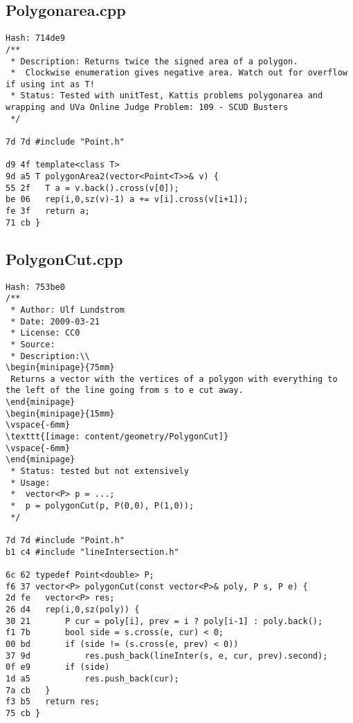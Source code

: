 \documentclass[11pt, a4paper, twoside]{article}
\begin{document}
\subsection{Polygonarea.cpp}
\begin{lstlisting}
Hash: 714de9
/**
 * Description: Returns twice the signed area of a polygon.
 *  Clockwise enumeration gives negative area. Watch out for overflow if using int as T!
 * Status: Tested with unitTest, Kattis problems polygonarea and wrapping and UVa Online Judge Problem: 109 - SCUD Busters
 */

7d 7d #include "Point.h"

d9 4f template<class T>
9d a5 T polygonArea2(vector<Point<T>>& v) {
55 2f 	T a = v.back().cross(v[0]);
be 06 	rep(i,0,sz(v)-1) a += v[i].cross(v[i+1]);
fe 3f 	return a;
71 cb }
\end{lstlisting}

\subsection{PolygonCut.cpp}
\begin{lstlisting}
Hash: 753be0
/**
 * Author: Ulf Lundstrom
 * Date: 2009-03-21
 * License: CC0
 * Source:
 * Description:\\
\begin{minipage}{75mm}
 Returns a vector with the vertices of a polygon with everything to the left of the line going from s to e cut away.
\end{minipage}
\begin{minipage}{15mm}
\vspace{-6mm}
\texttt{[image: content/geometry/PolygonCut]}
\vspace{-6mm}
\end{minipage}
 * Status: tested but not extensively
 * Usage:
 * 	vector<P> p = ...;
 * 	p = polygonCut(p, P(0,0), P(1,0));
 */

7d 7d #include "Point.h"
b1 c4 #include "lineIntersection.h"

6c 62 typedef Point<double> P;
f6 37 vector<P> polygonCut(const vector<P>& poly, P s, P e) {
2d fe 	vector<P> res;
26 d4 	rep(i,0,sz(poly)) {
30 21 		P cur = poly[i], prev = i ? poly[i-1] : poly.back();
f1 7b 		bool side = s.cross(e, cur) < 0;
00 bd 		if (side != (s.cross(e, prev) < 0))
37 9d 			res.push_back(lineInter(s, e, cur, prev).second);
0f e9 		if (side)
1d a5 			res.push_back(cur);
7a cb 	}
f3 b5 	return res;
75 cb }
\end{lstlisting}
\end{document}
